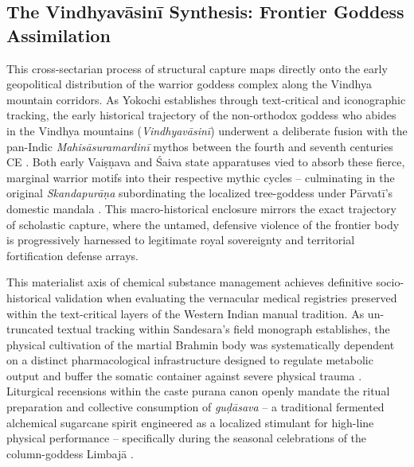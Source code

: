 \documentclass[11pt,twoside,letterpaper]{article}
\begin{document}
\subsection{The Vindhyav\={a}sin\={i} Synthesis: Frontier Goddess Assimilation}
This cross-sectarian process of structural capture maps directly onto the early geopolitical distribution of the warrior goddess complex along the Vindhya mountain corridors. As Yokochi establishes through text-critical and iconographic tracking, the early historical trajectory of the non-orthodox goddess who abides in the Vindhya mountains (\textit{Vindhyav\={a}sin\={i}}) underwent a deliberate fusion with the pan-Indic \textit{Mahis\={a}suramardin\={i}} mythos between the fourth and seventh centuries CE \citep{Yokochi1999}. Both early Vai\d{s}\d{n}ava and \'{S}aiva state apparatuses vied to absorb these fierce, marginal warrior motifs into their respective mythic cycles -- culminating in the original \textit{Skandapur\={a}\d{n}a} subordinating the localized tree-goddess under P\={a}rvat\={i}’s domestic mandala \citep{Yokochi1999}. This macro-historical enclosure mirrors the exact trajectory of scholastic capture, where the untamed, defensive violence of the frontier body is progressively harnessed to legitimate royal sovereignty and territorial fortification defense arrays.

This materialist axis of chemical substance management achieves definitive socio-historical validation when evaluating the vernacular medical registries preserved within the text-critical layers of the Western Indian manual tradition. As un-truncated textual tracking within Sandesara’s field monograph establishes, the physical cultivation of the martial Brahmin body was systematically dependent on a distinct pharmacological infrastructure designed to regulate metabolic output and buffer the somatic container against severe physical trauma \citep{Sandesara1948}. Liturgical recensions within the caste purana canon openly mandate the ritual preparation and collective consumption of \textit{gu\d{d}\={a}sava} – a traditional fermented alchemical sugarcane spirit engineered as a localized stimulant for high-line physical performance – specifically during the seasonal celebrations of the column-goddess Limbaj\={a} \citep{Sandesara1948}. 
\end{document}
